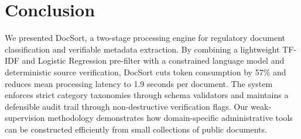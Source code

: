 \documentclass{article}
\begin{document}
\section{Conclusion}

We presented DocSort, a two-stage processing engine for regulatory document classification and verifiable metadata extraction. By combining a lightweight TF-IDF and Logistic Regression pre-filter with a constrained language model and deterministic source verification, DocSort cuts token consumption by 57\% and reduces mean processing latency to 1.9 seconds per document. The system enforces strict category taxonomies through schema validators and maintains a defensible audit trail through non-destructive verification flags. Our weak-supervision methodology demonstrates how domain-specific administrative tools can be constructed efficiently from small collections of public documents.



\end{document}
